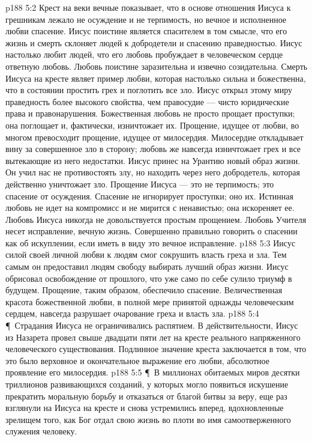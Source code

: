 \vs p188 5:2 Крест на веки вечные показывает, что в основе отношения Иисуса к грешникам лежало не осуждение и не терпимость, но вечное и исполненное любви спасение. Иисус поистине является спасителем в том смысле, что его жизнь и смерть склоняет людей к добродетели и спасению праведностью. Иисус настолько любит людей, что его любовь пробуждает в человеческом сердце ответную любовь. Любовь поистине заразительна и извечно созидательна. Смерть Иисуса на кресте являет пример любви, которая настолько сильна и божественна, что в состоянии простить грех и поглотить все зло. Иисус открыл этому миру праведность более высокого свойства, чем правосудие --- чисто юридические права и правонарушения. Божественная любовь не просто прощает проступки; она поглощает и, фактически, изничтожает их. Прощение, идущее от любви, во многом превосходит прощение, идущее от милосердия. Милосердие откладывает вину за совершенное зло в сторону; любовь же навсегда изничтожает грех и все вытекающие из него недостатки. Иисус принес на Урантию новый образ жизни. Он учил нас не противостоять злу, но находить через него добродетель, которая действенно уничтожает зло. Прощение Иисуса --- это не терпимость; это спасение от осуждения. Спасение не игнорирует проступки; оно  их. Истинная любовь не идет на компромисс и не мирится с ненавистью; она искореняет ее. Любовь Иисуса никогда не довольствуется простым прощением. Любовь Учителя несет исправление, вечную жизнь. Совершенно правильно говорить о спасении как об искуплении, если иметь в виду это вечное исправление.
\vs p188 5:3 Иисус силой своей личной любви к людям смог сокрушить власть греха и зла. Тем самым он предоставил людям свободу выбирать лучший образ жизни. Иисус обрисовал освобождение от прошлого, что уже само по себе сулило триумф в будущем. Прощение, таким образом, обеспечило спасение. Величественная красота божественной любви, в полной мере принятой однажды человеческим сердцем, навсегда разрушает очарование греха и власть зла.
\vs p188 5:4 \P\ Страдания Иисуса не ограничивались распятием. В действительности, Иисус из Назарета провел свыше двадцати пяти лет на кресте реального напряженного человеческого существования. Подлинное значение креста заключается в том, что это было верховное и окончательное выражение его любви, абсолютное проявление его милосердия.
\vs p188 5:5 \P\ В миллионах обитаемых миров десятки триллионов развивающихся созданий, у которых могло появиться искушение прекратить моральную борьбу и отказаться от благой битвы за веру, еще раз взглянули на Иисуса на кресте и снова устремились вперед, вдохновленные зрелищем того, как Бог отдал свою жизнь во плоти во имя самоотверженного служения человеку.
